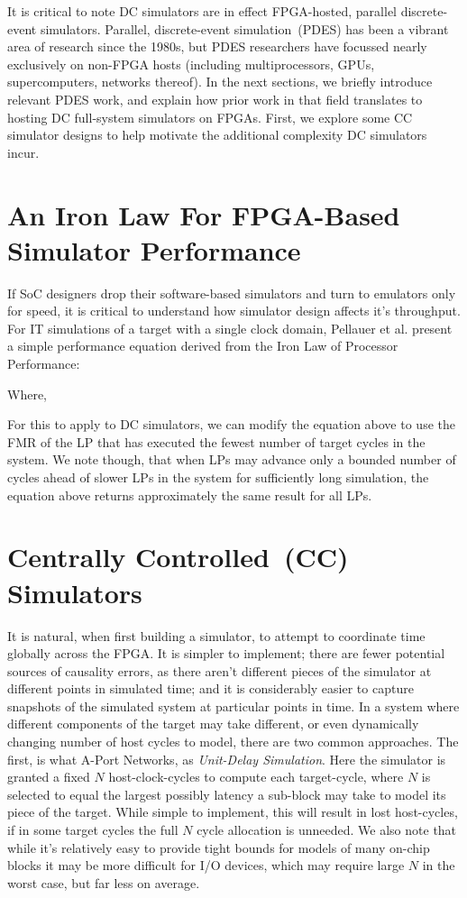 It is critical to note DC simulators are in effect FPGA-hosted, parallel
discrete-event simulators.  Parallel, discrete-event simulation~(PDES) has been
a vibrant area of research since the 1980s, but PDES researchers have focussed
nearly exclusively on non-FPGA hosts (including multiprocessors, GPUs,
supercomputers, networks thereof).  In the next sections, we briefly introduce
relevant PDES work, and explain how prior work in that field translates to
hosting DC full-system simulators on FPGAs. First, we explore some
CC simulator designs to help motivate the additional complexity DC simulators incur.

\section{An Iron Law For FPGA-Based Simulator Performance}

If SoC designers drop their software-based simulators and turn to emulators only for speed, it is critical
to understand how simulator design affects it's throughput. For IT simulations of a target
with a single clock domain, Pellauer et al. present a simple performance equation derived from the 
Iron Law of Processor Performance:


Where,

For this to apply to DC simulators, we can modify the equation above to use the FMR of
the LP that has executed the fewest number of target cycles in the system. We
note though, that when LPs may advance only a bounded number of cycles ahead of
slower LPs in the system for sufficiently long simulation, the equation above
returns approximately the same result for all LPs.




\section{Centrally Controlled~(CC) Simulators}

It is natural, when first building a simulator, to attempt to coordinate time
globally across the FPGA. It is simpler to implement; there are fewer potential
sources of causality errors, as there aren't different pieces of the simulator at different points in simulated time; and it is considerably
easier to capture snapshots of the simulated system at particular points in
time. In a system where different components of the target may take different,
or even dynamically changing number of host cycles to model, there are two
common approaches.  The first, is what A-Port Networks, as \emph{Unit-Delay
Simulation}. Here the simulator is granted a fixed $N$ host-clock-cycles to
compute each target-cycle, where $N$ is selected to equal the largest possibly
latency a sub-block may take to model its piece of the target. While simple to
implement, this will result in lost host-cycles, if in some target cycles the
full $N$ cycle allocation is unneeded.  We also note that while it's
relatively easy to provide tight bounds for models of many on-chip
blocks it may be more difficult for I/O devices, which may require large $N$
in the worst case, but far less on average.


